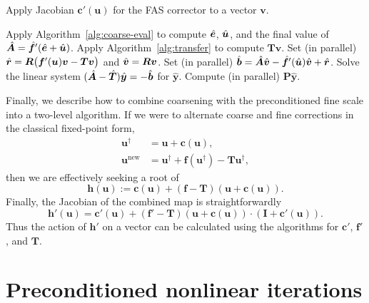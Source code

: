 \begin{algorithm}[tbp]
  \caption{Apply Jacobian $\bm{c}'(\bm{u})$ for the FAS corrector to a vector $\bm{v}$.}
  \label{alg:FAS-jac}
  \begin{algorithmic}
    \STATE Apply Algorithm~\ref{alg:coarse-eval} to compute $\hat{\bm{e}}$, $\hat{\bm{u}}$, and the final value of $\hat{\bm{A}}=\hat{\bm{f}}'(\hat{\bm{e}} + \hat{\bm{u}})$.
    \STATE Apply Algorithm~\ref{alg:transfer} to compute $\bm{T}\bm{v}$.
    \STATE Set (in parallel) $\hat{\bm{r}} = \bm{R} \bigl( \bm{f}'(\bm{u}) \bm{v} - \bm{T}\bm{v} \bigr)$ and
    $\hat{\bm{v}} = \bm{R}\bm{v}$.
    \STATE Set (in parallel) $\hat{\bm{b}} =  \hat{\bm{A}}\hat{\bm{v}} - \hat{\bm{f}}'(\hat{\bm{u}})\hat{\bm{v}} + \hat{\bm{r}}$.
    \STATE Solve the linear system $ ( \hat{\bm{A}}-\hat{\bm{T}}) \hat{\bm{y}} =- \hat{\bm{b}}$ for $\hat{\bm{y}}$.
    \STATE Compute (in parallel) $\bm{P} \hat{\bm{y}}$.
  \end{algorithmic}
\end{algorithm}


Finally, we describe how to combine coarsening with the preconditioned fine scale into a two-level algorithm. If we were to alternate coarse and fine corrections in the classical fixed-point form, 
\begin{align*}
  \bm{u}^{\dagger} &= \bm{u} + \bm{c}( \bm{u} ), \\
  \bm{u}^{\text{new}} &= \bm{u}^{\dagger} + \bm{f}( \bm{u}^{\dagger} ) - \bm{T} \bm{u}^\dagger,
\end{align*}
then we are effectively seeking a root of
\begin{equation}
  \label{eq:2level-residual}
  \bm{h}(\bm{u}) := \bm{c}( \bm{u} ) + (\bm{f}-\bm{T})( \bm{u} + \bm{c}( \bm{u} ) ).
\end{equation}
Finally, the Jacobian of the combined map is straightforwardly
\begin{equation}
  \label{eq:2level-jac}
  \bm{h}'(\bm{u}) = \bm{c}'( \bm{u} ) + (\bm{f}'-\bm{T})( \bm{u} + \bm{c}( \bm{u} ) )\cdot(\bm{I} + \bm{c}'( \bm{u} )).
\end{equation}
Thus the action of $\bm{h'}$ on a vector can be calculated using the algorithms for $\bm{c}'$, $\bm{f}'$, and $\bm{T}$. 


\section{Preconditioned nonlinear iterations}
\label{sec:preconditioning}

